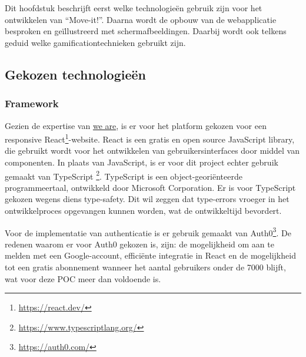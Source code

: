 \chapter{}%
\label{ch:proofofconcept}

Dit hoofdstuk beschrijft eerst welke technologieën gebruik zijn voor het ontwikkelen van ``Move-it!''. Daarna wordt de opbouw van de webapplicatie besproken en geïllustreerd met schermafbeeldingen. Daarbij wordt ook telkens geduid welke gamificationtechnieken gebruikt zijn.

\section{Gekozen technologieën}

\subsection{Framework}

Gezien de expertise van \href{https://www.we-are.be/}{we are}, is er voor het platform gekozen voor een responsive React\footnote{\href{https://react.dev/}{https://react.dev/}}-website. React is een gratis en open source JavaScript library, die gebruikt wordt voor het ontwikkelen van gebruikersinterfaces door middel van componenten. In plaats van JavaScript, is er voor dit project echter gebruik gemaakt van TypeScript \footnote{\href{https://www.typescriptlang.org/}{https://www.typescriptlang.org/}}. TypeScript is een object-georiënteerde programmeertaal, ontwikkeld door Microsoft Corporation. Er is voor TypeScript gekozen wegens diens type-safety. Dit wil zeggen dat type-errors vroeger in het ontwikkelproces opgevangen kunnen worden, wat de ontwikkeltijd bevordert.

Voor de implementatie van authenticatie is er gebruik gemaakt van Auth0\footnote{\href{https://auth0.com/}{https://auth0.com/}}. De redenen waarom er voor Auth0 gekozen is, zijn: de mogelijkheid om aan te melden met een Google-account, efficiënte integratie in React en de mogelijkheid tot een gratis abonnement wanneer het aantal gebruikers onder de 7000 blijft, wat voor deze POC meer dan voldoende is.

